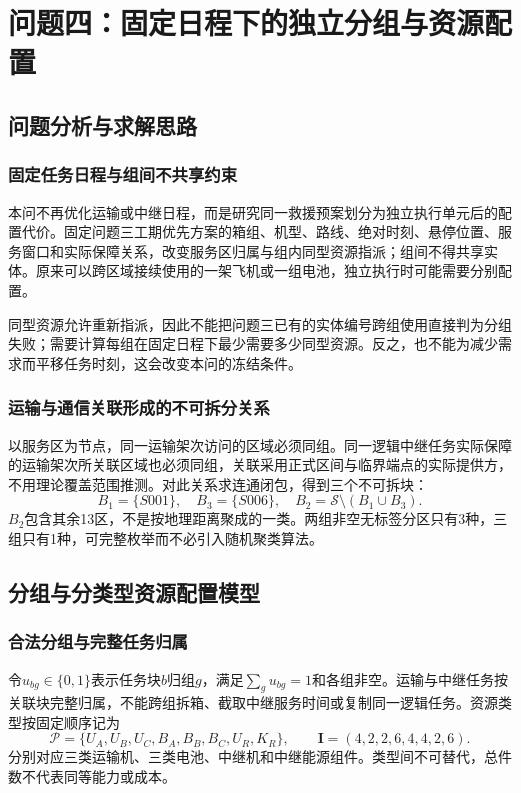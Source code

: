 \section{问题四：固定日程下的独立分组与资源配置}
\label{sec:q4}

\subsection{问题分析与求解思路}
\subsubsection{固定任务日程与组间不共享约束}
本问不再优化运输或中继日程，而是研究同一救援预案划分为独立执行单元后的配置代价。固定问题三工期优先方案的箱组、机型、路线、绝对时刻、悬停位置、服务窗口和实际保障关系，改变服务区归属与组内同型资源指派；组间不得共享实体。原来可以跨区域接续使用的一架飞机或一组电池，独立执行时可能需要分别配置。

同型资源允许重新指派，因此不能把问题三已有的实体编号跨组使用直接判为分组失败；需要计算每组在固定日程下最少需要多少同型资源。反之，也不能为减少需求而平移任务时刻，这会改变本问的冻结条件。

\subsubsection{运输与通信关联形成的不可拆分关系}
以服务区为节点，同一运输架次访问的区域必须同组。同一逻辑中继任务实际保障的运输架次所关联区域也必须同组，关联采用正式区间与临界端点的实际提供方，不用理论覆盖范围推测。对此关系求连通闭包，得到三个不可拆块：
\begin{equation}
 B_1=\{S001\},\quad B_3=\{S006\},\quad
 B_2=\mathcal S\setminus(B_1\cup B_3).
\label{eq:q4_blocks}
\end{equation}
$B_2$包含其余13区，不是按地理距离聚成的一类。两组非空无标签分区只有3种，三组只有1种，可完整枚举而不必引入随机聚类算法。



\subsection{分组与分类型资源配置模型}
\subsubsection{合法分组与完整任务归属}
令$u_{bg}\in\{0,1\}$表示任务块$b$归组$g$，满足$\sum_gu_{bg}=1$和各组非空。运输与中继任务按关联块完整归属，不能跨组拆箱、截取中继服务时间或复制同一逻辑任务。资源类型按固定顺序记为
\begin{equation}
 \mathcal P=\{U_A,U_B,U_C,B_A,B_B,B_C,U_R,K_R\},\qquad
 \boldsymbol I=(4,2,2,6,4,4,2,6).
\label{eq:q4_inventory}
\end{equation}
分别对应三类运输机、三类电池、中继机和中继能源组件。类型间不可替代，总件数不代表同等能力或成本。

